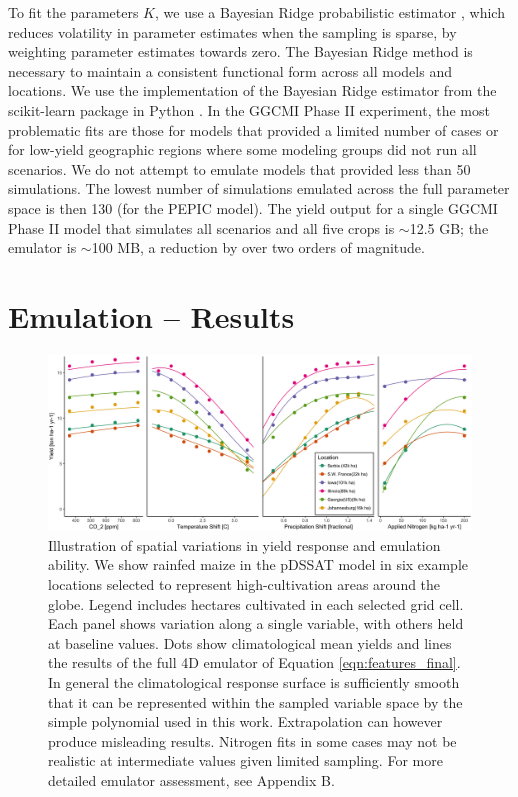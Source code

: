 \documentclass[gmd, manuscript]{copernicus} %
\begin{document}
To fit the parameters $K$, we use a Bayesian Ridge probabilistic estimator \citep{MacKay91}, which reduces volatility in parameter estimates when the sampling is sparse, by weighting parameter estimates towards zero. The Bayesian Ridge method is necessary to maintain a consistent functional form across all models and locations. We use the implementation of the Bayesian Ridge estimator from the scikit-learn package in Python \citep{scikit-learn}. In the GGCMI Phase II experiment, the most problematic fits are those for models that provided a limited number of cases or for low-yield geographic regions where some modeling groups did not run all scenarios. We do not attempt to emulate models that provided less than 50 simulations. The lowest number of simulations emulated across the full parameter space is then 130 (for the PEPIC model). The yield output for a single GGCMI Phase II model that simulates all scenarios and all five crops is $\sim$12.5 GB; the emulator is $\sim$100 MB, a reduction by over two orders of magnitude. 

\section{Emulation -- Results}
\label{S:5}

\begin{figure}[ht]
\centering
    \includegraphics[width=16cm]{figures/regression_areas.png}
    \caption{Illustration of spatial variations in yield response and emulation ability. We show rainfed maize in the pDSSAT model in six example locations selected to represent high-cultivation areas around the globe. Legend includes hectares cultivated in each selected grid cell. Each panel shows variation along a single variable, with others held at baseline values. Dots show climatological mean yields and lines the results of the full 4D emulator of Equation \ref{eqn:features_final}. In general the climatological response surface is sufficiently smooth that it can be represented within the sampled variable space by the simple polynomial used in this work. Extrapolation can however produce misleading results. Nitrogen fits in some cases may not be realistic at intermediate values given limited sampling. For more detailed emulator assessment, see Appendix B.}
   \label{fig:regression}
\end{figure}
\end{document}

